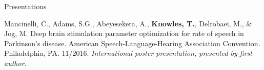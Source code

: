 \documentclass{resume} %
\begin{document}
\begin{rSection}{Presentations}
\begin{etaremune}

	
	
%	
%	
	
\item Mancinelli, C., Adams, S.G., Abeyesekera, A., {\bf Knowles, T.}, Delrobaei, M., \& Jog, M. Deep brain stimulation parameter optimization for rate of speech in Parkinson's disease. American Speech-Language-Hearing Association Convention. Philadelphia, PA. 11/2016. \emph{International poster presentation, presented by first author.}
	

\end{etaremune}
\end{rSection}
\end{document}
